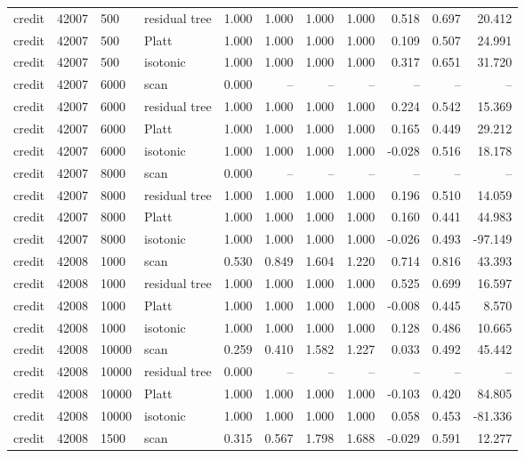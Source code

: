 \begin{tabular}{lrllrrrrrrr}
credit & 42007 & 500 & residual tree & 1.000 & 1.000 & 1.000 & 1.000 & 0.518 & 0.697 & 20.412 \\
credit & 42007 & 500 & Platt & 1.000 & 1.000 & 1.000 & 1.000 & 0.109 & 0.507 & 24.991 \\
credit & 42007 & 500 & isotonic & 1.000 & 1.000 & 1.000 & 1.000 & 0.317 & 0.651 & 31.720 \\
credit & 42007 & 6000 & scan & 0.000 & -- & -- & -- & -- & -- & -- \\
credit & 42007 & 6000 & residual tree & 1.000 & 1.000 & 1.000 & 1.000 & 0.224 & 0.542 & 15.369 \\
credit & 42007 & 6000 & Platt & 1.000 & 1.000 & 1.000 & 1.000 & 0.165 & 0.449 & 29.212 \\
credit & 42007 & 6000 & isotonic & 1.000 & 1.000 & 1.000 & 1.000 & -0.028 & 0.516 & 18.178 \\
credit & 42007 & 8000 & scan & 0.000 & -- & -- & -- & -- & -- & -- \\
credit & 42007 & 8000 & residual tree & 1.000 & 1.000 & 1.000 & 1.000 & 0.196 & 0.510 & 14.059 \\
credit & 42007 & 8000 & Platt & 1.000 & 1.000 & 1.000 & 1.000 & 0.160 & 0.441 & 44.983 \\
credit & 42007 & 8000 & isotonic & 1.000 & 1.000 & 1.000 & 1.000 & -0.026 & 0.493 & -97.149 \\
credit & 42008 & 1000 & scan & 0.530 & 0.849 & 1.604 & 1.220 & 0.714 & 0.816 & 43.393 \\
credit & 42008 & 1000 & residual tree & 1.000 & 1.000 & 1.000 & 1.000 & 0.525 & 0.699 & 16.597 \\
credit & 42008 & 1000 & Platt & 1.000 & 1.000 & 1.000 & 1.000 & -0.008 & 0.445 & 8.570 \\
credit & 42008 & 1000 & isotonic & 1.000 & 1.000 & 1.000 & 1.000 & 0.128 & 0.486 & 10.665 \\
credit & 42008 & 10000 & scan & 0.259 & 0.410 & 1.582 & 1.227 & 0.033 & 0.492 & 45.442 \\
credit & 42008 & 10000 & residual tree & 0.000 & -- & -- & -- & -- & -- & -- \\
credit & 42008 & 10000 & Platt & 1.000 & 1.000 & 1.000 & 1.000 & -0.103 & 0.420 & 84.805 \\
credit & 42008 & 10000 & isotonic & 1.000 & 1.000 & 1.000 & 1.000 & 0.058 & 0.453 & -81.336 \\
credit & 42008 & 1500 & scan & 0.315 & 0.567 & 1.798 & 1.688 & -0.029 & 0.591 & 12.277 \\

\end{tabular}
